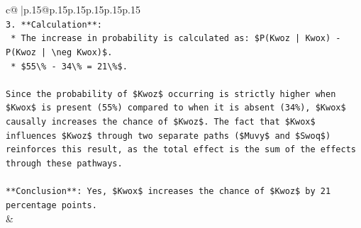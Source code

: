 \documentclass{article}
\begin{document}
{\begin{supertabular}{c@{$\;$}|p{.15\linewidth}@{}p{.15\linewidth}p{.15\linewidth}p{.15\linewidth}p{.15\linewidth}p{.15\linewidth}}
{{{\\ 
\texttt{3.  **Calculation**:} \\
\texttt{    *   The increase in probability is calculated as: \$P(Kwoz | Kwox) {-} P(Kwoz | \textbackslash{}neg Kwox)\$.} \\
\texttt{    *   \$55\textbackslash{}\% {-} 34\textbackslash{}\% = 21\textbackslash{}\%\$.} \\
\\ 
\texttt{Since the probability of \$Kwoz\$ occurring is strictly higher when \$Kwox\$ is present (55\%) compared to when it is absent (34\%), \$Kwox\$ causally increases the chance of \$Kwoz\$. The fact that \$Kwox\$ influences \$Kwoz\$ through two separate paths (\$Muvy\$ and \$Swoq\$) reinforces this result, as the total effect is the sum of the effects through these pathways.} \\
\\ 
\texttt{**Conclusion**: Yes, \$Kwox\$ increases the chance of \$Kwoz\$ by 21 percentage points.} \\
            }
        }
    }
    & \\ \\


\end{supertabular}}
\end{document}
